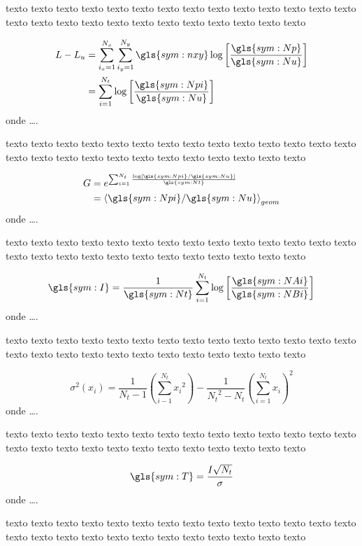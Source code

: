 texto texto texto texto texto texto texto texto texto texto texto texto texto
texto texto texto texto texto texto texto texto texto texto texto texto texto


\begin{equation}
	\ensuremath{
	\begin{align}
		L - L_u & = \sum_{i_x = 1}^{N_x}\sum_{i_y=1}^{N_y}
				  \gls{sym:nxy}\log \left[ \frac{\gls{sym:Np}}{\gls{sym:Nu}} \right] \\
				& = \sum_{i = 1}^{N_t}\log \left[\frac{\gls{sym:Npi}}{\gls{sym:Nu}} \right]
	\end{align}}
	\label{eq:llu}
\end{equation}
onde \ldots.


texto texto texto texto texto texto texto texto texto texto texto texto texto
texto texto texto texto texto texto texto texto texto texto texto texto texto


\begin{equation}
	\ensuremath{
	\begin{align}
		G & = e^{\sum_{i = 1}^{N_t}
					\frac{\log \left[  \gls{sym:Npi} / \gls{sym:Nu}  \right]}
						 {\gls{sym:Nt}}
			  } \\
		  & = {\langle  \gls{sym:Npi} / \gls{sym:Nu}  \rangle}_{geom}
	\end{align}}
	\label{eq:G}
\end{equation}
onde \ldots.


texto texto texto texto texto texto texto texto texto texto texto texto texto
texto texto texto texto texto texto texto texto texto texto texto texto texto

\begin{equation}
	\ensuremath{
		\gls{sym:I} = \frac{1}{\gls{sym:Nt}} 
					  \sum_{i = 1}^{N_t}\log\left[ \frac{\gls{sym:NAi}}
					  								  {\gls{sym:NBi}}  \right]
	}
	\label{eq:gain}
\end{equation}
onde \ldots.


texto texto texto texto texto texto texto texto texto texto texto texto texto
texto texto texto texto texto texto texto texto texto texto texto texto texto





\begin{equation}
	\ensuremath{
		\sigma^2(x_i) = 	\frac{1}{N_t - 1}
					{\left(
					\sum_{i-1}^{N_t}
						{x_i}^2 
					\right)}
					- 
					\frac{1}{{N_t}^2 - N_t}
					{\left(
						\sum_{i=1}^{N_t}{x_i}
					\right)}^2
	}
	\label{eq:var}
\end{equation}
onde \ldots.


texto texto texto texto texto texto texto texto texto texto texto texto texto
texto texto texto texto texto texto texto texto texto texto texto texto texto




\begin{equation}
	\ensuremath{
		\gls{sym:T} = \frac{I\sqrt{N_t}}{\sigma}
	}
	\label{eq:T}
\end{equation}
onde \ldots.


texto texto texto texto texto texto texto texto texto texto texto texto texto
texto texto texto texto texto texto texto texto texto texto texto texto texto


